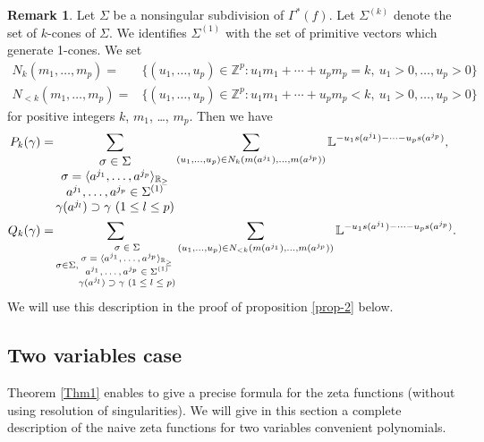 \documentclass[12pt,a4paper,leqno]{amsart}
\theoremstyle{definition}
\newtheorem{rem}[thm]{Remark}
\begin{document}
\begin{rem}
Let $\Sigma$ be a nonsingular subdivision of $\Gamma^*(f)$. 
Let $\Sigma^{(k)}$ denote the set of $k$-cones of $\Sigma$. 
We identifies $\Sigma^{(1)}$ with the set of primitive vectors 
which generate 1-cones.  
We set 
\begin{align*}
N_k(m_1,\dots,m_p)=&
\{(u_1,\dots,u_p)\in{\mathbb{Z}}^p:
u_1m_1+\cdots+u_pm_p=k,\ u_1>0,\dots,u_p>0\}
\\
N_{<k}(m_1,\dots,m_p)=&
\{(u_1,\dots,u_p)\in{\mathbb{Z}}^p:
u_1m_1+\cdots+u_pm_p<k,\ u_1>0,\dots,u_p>0\}
\end{align*}
for positive integers $k$, $m_1$, \dots, $m_p$. 
Then we have 
\begin{align*}
P_k(\gamma)=&
\sum_{\begin{matrix}
\sigma\in\Sigma\\
\sigma=\langle a^{j_1}, \dots, a^{j_p}\rangle_{{\mathbb{R}}_\ge}\\
a^{j_1},\dots,a^{j_p}\in\Sigma^{(1)}\\
\gamma(a^{j_l})\supset\gamma\ (1\le l\le p)
\end{matrix}}
\sum_{(u_1,\dots,u_p)\in N_k(m(a^{j_1}),\dots,m(a^{j_p}))}
{\mathbb{L}}^{-u_1s(a^{j_1})-\dots-u_ps(a^{j_p})},
\\
Q_k(\gamma)=&
\sum_{\sigma\in\Sigma,\textrm{\scriptsize
$\begin{matrix}
\sigma\in\Sigma\\
\sigma=\langle a^{j_1}, \dots, a^{j_p}\rangle_{{\mathbb{R}}_\ge}\\
a^{j_1},\dots,a^{j_p}\in\Sigma^{(1)}\\
\gamma(a^{j_l})\supset\gamma\ (1\le l\le p)
\end{matrix}$} }
\sum_{(u_1,\dots,u_p)\in N_{<k}(m(a^{j_1}),\dots,m(a^{j_p}))}
{\mathbb{L}}^{-u_1s(a^{j_1})-\dots-u_ps(a^{j_p})}.\\
\end{align*}
We will use this description in the proof of proposition \ref{prop-2} below.
\end{rem}

\subsection{Two variables case}
Theorem \ref{Thm1} enables to give a precise formula for the zeta
functions (without using resolution of singularities). We will give in
this section a complete description of the naive zeta functions for
two variables convenient polynomials.
\end{document}
